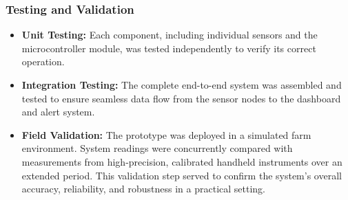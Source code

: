 \documentclass[../main.tex]{subfiles}
\begin{document}
\subsubsection{Testing and Validation}
\begin{itemize}
    \item \textbf{Unit Testing:} Each component, including individual sensors and the microcontroller module, was tested independently to verify its correct operation. 
    \item \textbf{Integration Testing:} The complete end-to-end system was assembled and tested to ensure seamless data flow from the sensor nodes to the dashboard and alert system. 
    \item \textbf{Field Validation:} The prototype was deployed in a simulated farm environment. System readings were concurrently compared with measurements from high-precision, calibrated handheld instruments over an extended period. This validation step served to confirm the system's overall accuracy, reliability, and robustness in a practical setting.
\end{itemize}
\end{document}
